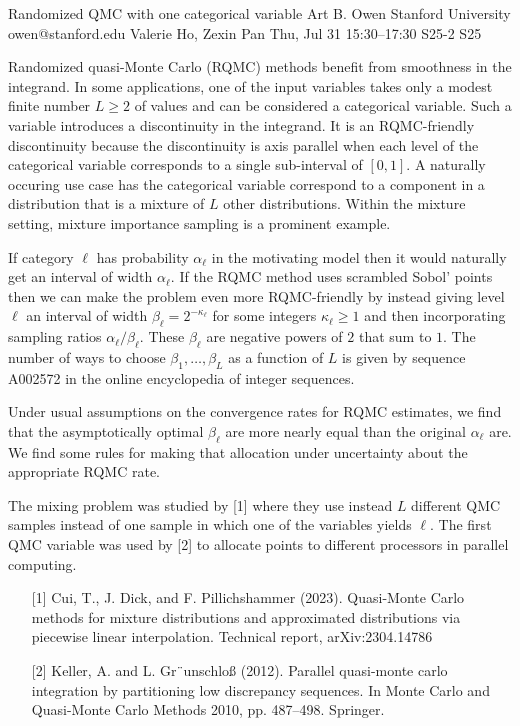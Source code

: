 \begin{talk}
  {Randomized QMC with one categorical variable}%
  {Art B. Owen}%
  {Stanford University}%
  {owen@stanford.edu}%
  {Valerie Ho, Zexin Pan}%
  {}%
  {Thu, Jul 31 15:30–17:30}%
  {S25-2}%
  {S25}%
  
				
			
  Randomized quasi-Monte Carlo (RQMC) methods benefit from smoothness
  in the integrand.  In some applications, one of the input variables takes
  only a modest finite number $L\geqslant2$
of values and can be considered a categorical
  variable. Such a variable introduces a discontinuity in the integrand.  It is
  an RQMC-friendly discontinuity because the discontinuity is axis parallel
  when each level of the categorical variable corresponds to a single
  sub-interval of $[0,1]$.  A naturally occuring use case has
  the categorical variable correspond to a component in a distribution
  that is a mixture of $L$ other distributions.  Within the mixture
  setting, mixture importance sampling is a prominent example.

 If category $\ell$  has probability $\alpha_\ell$ in the motivating
  model then it would naturally get an interval of width $\alpha_\ell$.
If the RQMC method uses scrambled Sobol' points
then we can make the problem even more RQMC-friendly by instead giving
  level $\ell$ an interval of width $\beta_\ell = 2^{-\kappa_\ell}$
  for some integers $\kappa_\ell \geqslant1$ and then
  incorporating sampling ratios $\alpha_\ell/\beta_\ell$.
  These $\beta_\ell$ are negative powers of $2$ that sum to $1$.
  The number of ways to choose $\beta_1,\dots,\beta_L$
  as a function of $L$ is given by sequence A002572 in the
  online encyclopedia of integer sequences.

  Under usual assumptions on the convergence rates for RQMC
  estimates, we find that the asymptotically optimal $\beta_\ell$
  are more nearly equal than the original $\alpha_\ell$ are.
  We find some rules for making that  allocation under uncertainty
  about the appropriate RQMC rate.

  The mixing problem was studied by [1] where they use instead
  $L$ different QMC samples instead of one sample in which
  one of the variables yields $\ell$. The first QMC variable
  was used by [2] to allocate points to different processors
  in parallel computing.

\medskip
\begin{enumerate}
	\item[{[1]}] Cui, T., J. Dick, and F. Pillichshammer (2023). Quasi-Monte Carlo methods
for mixture distributions and approximated distributions via piecewise linear
interpolation. Technical report, arXiv:2304.14786 
\item[{[2]}]
Keller, A. and L. Gr¨unschloß (2012). Parallel quasi-monte carlo integration by
partitioning low discrepancy sequences. In Monte Carlo and Quasi-Monte
Carlo Methods 2010, pp. 487–498. Springer.
\end{enumerate}

\end{talk}


